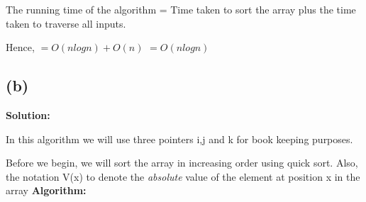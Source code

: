 \documentclass[12pt]{article}
\begin{document}
The running time of the algorithm  = Time taken to sort the array plus the time taken to traverse all inputs.

Hence,
$=O(nlogn)+O(n)$
$=O(nlogn)$

\subsection{(b)}
\textbf{Solution:}

In this algorithm we will use three pointers i,j and k for book keeping purposes. 

Before we begin, we will sort the array in increasing order using quick sort. Also, the notation V(x) to denote the \textit{absolute} value of the element at position x in the array 
\textbf{Algorithm: }
\end{document}
